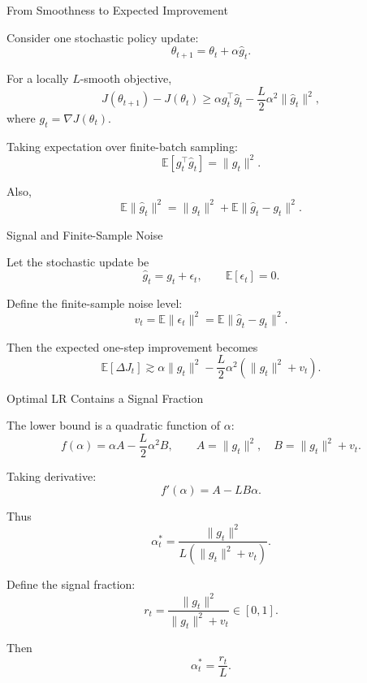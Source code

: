 \documentclass[aspectratio=169]{beamer}
\begin{document}
\begin{frame}{From Smoothness to Expected Improvement}
\small

Consider one stochastic policy update:
\[
  \theta_{t+1}=\theta_t+\alpha \hat g_t .
\]

For a locally \(L\)-smooth objective,
\[
  J(\theta_{t+1})-J(\theta_t)
  \ge
  \alpha g_t^\top \hat g_t
  -
  \frac{L}{2}\alpha^2\|\hat g_t\|^2 ,
\]
where \(g_t=\nabla J(\theta_t)\).

\vspace{0.7em}

Taking expectation over finite-batch sampling:
\[
  \mathbb E[g_t^\top \hat g_t]=\|g_t\|^2 .
\]

\vspace{0.6em}

Also,
\[
  \mathbb E\|\hat g_t\|^2
  =
  \|g_t\|^2
  +
  \mathbb E\|\hat g_t-g_t\|^2 .
\]

\end{frame}


\begin{frame}{Signal and Finite-Sample Noise}
\small

Let the stochastic update be
\[
  \hat g_t = g_t + \epsilon_t,
  \qquad
  \mathbb{E}[\epsilon_t]=0.
\]

\vspace{0.6em}

Define the finite-sample noise level:
\[
  v_t
  =
  \mathbb{E}\|\epsilon_t\|^2
  =
  \mathbb{E}\|\hat g_t-g_t\|^2 .
\]

\vspace{0.8em}

Then the expected one-step improvement becomes
\[
  \mathbb{E}[\Delta J_t]
  \gtrsim
  \alpha \|g_t\|^2
  -
  \frac{L}{2}\alpha^2
  \left(
    \|g_t\|^2+v_t
  \right).
\]

\vspace{0.9em}


\end{frame}


\begin{frame}{Optimal LR Contains a Signal Fraction}
\small

The lower bound is a quadratic function of \(\alpha\):
\[
  f(\alpha)
  =
  \alpha A
  -
  \frac{L}{2}\alpha^2 B,
  \qquad
  A=\|g_t\|^2,\quad
  B=\|g_t\|^2+v_t .
\]

Taking derivative:
\[
  f'(\alpha)=A-LB\alpha .
\]

Thus
\[
  \alpha_t^*
  =
  \frac{\|g_t\|^2}
       {L(\|g_t\|^2+v_t)} .
\]

Define the signal fraction:
\[
  r_t
  =
  \frac{\|g_t\|^2}
       {\|g_t\|^2+v_t}
  \in [0,1].
\]

Then
\[
  \alpha_t^*
  =
  \frac{r_t}{L}.
\]

\end{frame}
\end{document}
